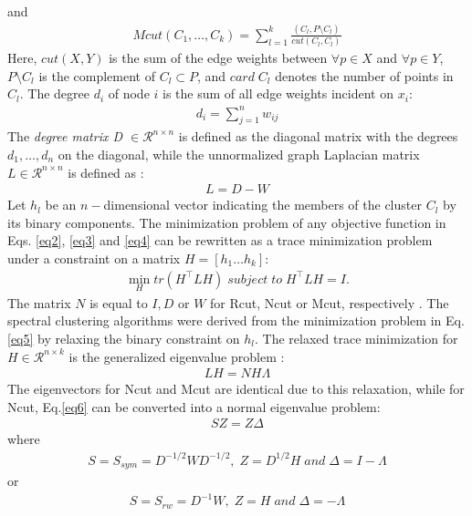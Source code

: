 \documentclass[12pt,letterpaper]{article}
\begin{document}
and
\begin{align}
Mcut (C_1,\dots,C_k) = \sum_{l=1}^k \frac{(C_l, P \setminus C_l)}{cut (C_l,C_l)} 
\label{eq4}
\end{align}
Here, $cut(X,Y)$ is the sum of the edge weights between $\forall p \in X$ and $\forall p \in Y$, $P\setminus C_l$ is the complement
of $C_l \subset P$, and $card\; C_l$ denotes the number of points in $C_l$.
The degree $d_i$ of node $i$ is the sum of all edge weights incident on $x_i$:
\begin{align}
d_i = \sum_{j=1}^n w_{ij}
\end{align} 
The \textit{degree matrix D $\in \mathcal{R}^{n \times n}$} is defined as the diagonal matrix with the degrees $d_1, \dots, d_n$ on the diagonal, while the %
unnormalized graph Laplacian matrix $L \in \mathcal{R}^{n \times n}$ is defined as \citep{Chung1997}:
\begin{align}
L = D - W
\end{align}
Let $h_l$ be an $n-$dimensional vector indicating the members of the cluster $C_l$ by its binary components. The minimization 
problem of any objective function in Eqs. \ref{eq2}, \ref{eq3} and \ref{eq4} can be rewritten as a trace minimization problem under a 
constraint on a matrix $H = [h_1 \dots h_k]$:
\begin{align}
\min_H tr (H^\top L H) \; subject \;to\;  H^\top L H = I.
\label{eq5}
\end{align}
The matrix $N$ is equal to $I, D$ or $W$ for Rcut, Ncut or Mcut, respectively \citep{ShiMalik2000, Ng2002}. The spectral clustering algorithms were derived from the
minimization problem in Eq. \ref{eq5} by relaxing the binary constraint on $h_l$. The relaxed trace minimization for $H \in \mathcal{R}^{n \times k}$ is the generalized eigenvalue problem \citep{vonLuxburg2007}:
\begin{align}
LH =NH\Lambda
\label{eq6}
\end{align}
The eigenvectors for Ncut and Mcut are identical due to this relaxation, while for Ncut, Eq.\ref{eq6} can be converted into
a normal eigenvalue problem:
\begin{align}
SZ = Z\Delta
\end{align}
where
\begin{align}
S = S_{sym} =  D^{-1/2}WD^{-1/2}, \; Z = D^{1/2} H \; and \; \Delta = I - \Lambda
\end{align}
or
\begin{align}
S=S_{rw} = D^{-1} W, \; Z = H \; and \; \Delta = - \Lambda
\end{align}
\end{document}
